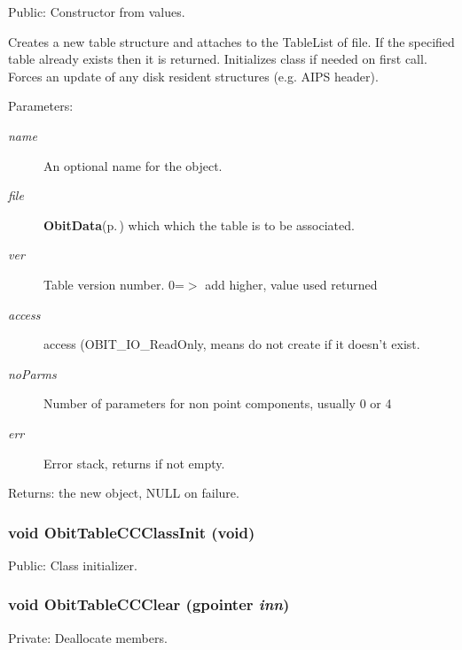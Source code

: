 Public: Constructor from values. 

Creates a new table structure and attaches to the Table\-List of file. If the specified table already exists then it is returned. Initializes class if needed on first call. Forces an update of any disk resident structures (e.g. AIPS header). \begin{Desc}
\item[Parameters:]
\begin{description}
\item[{\em name}]An optional name for the object. \item[{\em file}]{\bf Obit\-Data}{\rm (p.\,\pageref{structObitData})} which which the table is to be associated. \item[{\em ver}]Table version number. 0=$>$ add higher, value used returned \item[{\em access}]access (OBIT\_\-IO\_\-Read\-Only, means do not create if it doesn't exist. \item[{\em no\-Parms}]Number of parameters for non point components, usually 0 or 4 \item[{\em err}]Error stack, returns if not empty. \end{description}
\end{Desc}
\begin{Desc}
\item[Returns:]the new object, NULL on failure. \end{Desc}
\subsubsection{\setlength{\rightskip}{0pt plus 5cm}void Obit\-Table\-CCClass\-Init (void)}\label{ObitTableCC_8c_a27}


Public: Class initializer. 

\subsubsection{\setlength{\rightskip}{0pt plus 5cm}void Obit\-Table\-CCClear (gpointer {\em inn})}\label{ObitTableCC_8c_a9}


Private: Deallocate members. 

